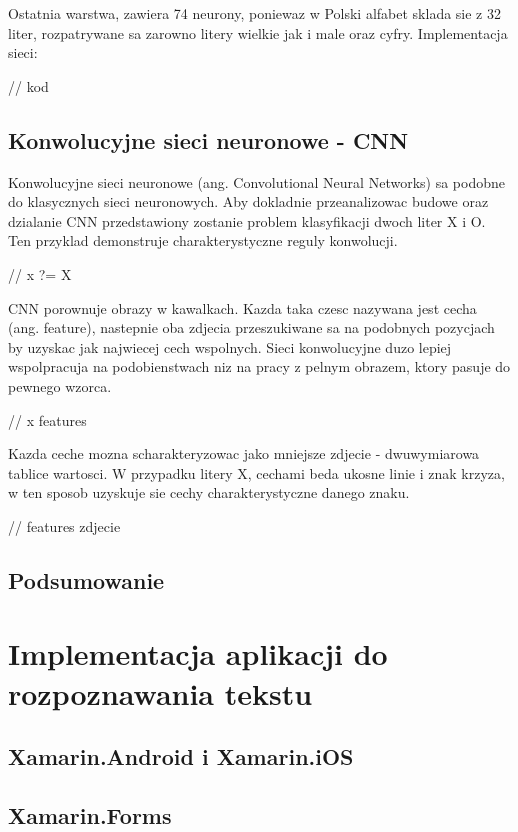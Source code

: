 \documentclass[brudnopis]{xmgr}
\begin{document}
Ostatnia warstwa, zawiera 74 neurony, poniewaz w Polski alfabet sklada sie z 32 liter, rozpatrywane sa zarowno litery wielkie jak i male oraz cyfry. Implementacja sieci:

// kod

\section{Konwolucyjne sieci neuronowe - CNN}

Konwolucyjne sieci neuronowe (ang. Convolutional Neural Networks) sa podobne do klasycznych sieci neuronowych. Aby dokladnie przeanalizowac budowe oraz dzialanie CNN przedstawiony zostanie problem klasyfikacji dwoch liter X i O. Ten przyklad demonstruje charakterystyczne reguly konwolucji.

// x ?= X

CNN porownuje obrazy w kawalkach. Kazda taka czesc nazywana jest cecha (ang. feature), nastepnie oba zdjecia przeszukiwane sa na podobnych pozycjach by uzyskac jak najwiecej cech wspolnych. Sieci konwolucyjne duzo lepiej wspolpracuja na podobienstwach niz na pracy z pelnym obrazem, ktory pasuje do pewnego wzorca.

// x features

Kazda ceche mozna scharakteryzowac jako mniejsze zdjecie - dwuwymiarowa tablice wartosci. W przypadku litery X, cechami beda ukosne linie i znak krzyza, w ten sposob uzyskuje sie cechy charakterystyczne danego znaku.

// features zdjecie



\section{Podsumowanie}

\chapter{Implementacja aplikacji do rozpoznawania tekstu}

\section{Xamarin.Android i Xamarin.iOS}

\section{Xamarin.Forms}
\end{document}
